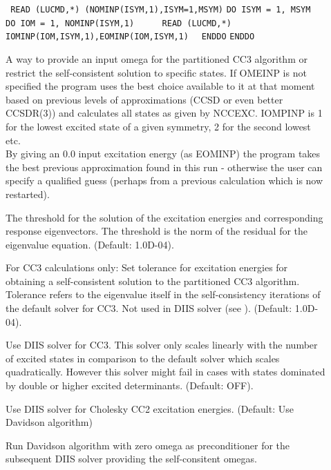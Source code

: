 \begin{description}
\item[]\verb| |\newline
%
\verb|READ (LUCMD,*) (NOMINP(ISYM,1),ISYM=1,MSYM)|\newline
\verb|DO ISYM = 1, MSYM|\newline
\verb|  DO IOM = 1, NOMINP(ISYM,1)|\newline
\verb|     READ (LUCMD,*) IOMINP(IOM,ISYM,1),EOMINP(IOM,ISYM,1)|\newline
\verb|  ENDDO|\newline
\verb|ENDDO|

A way to provide an input omega for the partitioned CC3 algorithm or restrict
the self-consistent solution to specific states.
If OMEINP is not specified the program uses the best choice available to it at that
moment based on previous levels of approximations (CCSD or even better CCSDR(3)) 
and calculates all states as given by NCCEXC.
IOMPINP is 1 for the lowest excited state of a given symmetry, 2 for the second lowest etc. \\
By giving an 0.0 input excitation energy (as EOMINP) the program takes the best previous
approximation found in this run - otherwise the user can specify a qualified guess 
(perhaps from a previous calculation which is now restarted).

\item[] 

The threshold for the solution of the excitation energies and
corresponding response eigenvectors. 
The threshold is the norm of the residual for the eigenvalue equation.
(Default: 1.0D-04). 

%
%
%
%
%
%
%
\item[] 
For CC3 calculations only: 
Set tolerance for excitation energies for obtaining a self-consistent
solution to the partitioned CC3 algorithm.
Tolerance refers to the eigenvalue itself in the self-consistency iterations
of the default solver for CC3. Not used in DIIS solver (see ).
(Default: 1.0D-04).

\item[]
Use DIIS solver for CC3.
This solver only scales linearly with the number of excited states
in comparison to the default solver which scales quadratically.
However this solver might fail in cases with states dominated by
double or higher excited determinants. 
(Default: OFF).
%
\item[]
Use DIIS solver for Cholesky CC2 excitation energies.
(Default: Use Davidson algorithm)
%
\item[]
Run Davidson algorithm with zero omega as preconditioner for the 
subsequent DIIS solver providing the self-consitent omegas.

%
%
\end{description}
